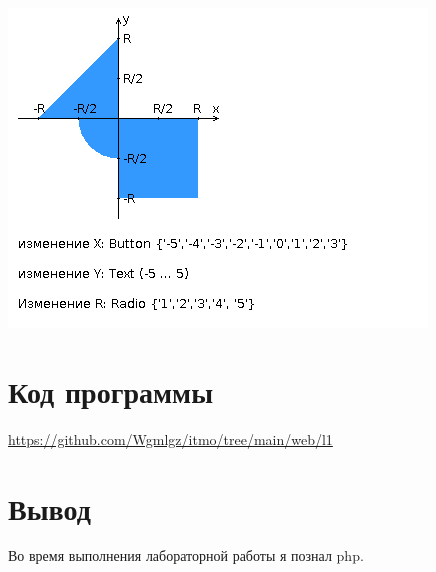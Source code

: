 \documentclass{article}
\begin{document}
\begin{center}
  \includegraphics{task.png}
\end{center}

\section{Код программы}


\url{https://github.com/Wgmlgz/itmo/tree/main/web/l1}
\section{Вывод}
Во время выполнения лабораторной работы я познал php.
\end{document}
